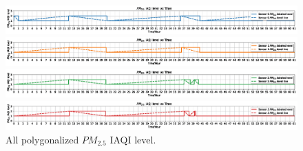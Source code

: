 \begin{figure}[!htbp]
    \begin{center}
        \includegraphics[width=\linewidth]{fig/labeled_iaqi_level/pm25_0_labeled_iaqi_level.png}
    \end{center}
    \begin{center}
        \includegraphics[width=\linewidth]{fig/labeled_iaqi_level/pm25_1_labeled_iaqi_level.png}
    \end{center}
    \begin{center}
        \includegraphics[width=\linewidth]{fig/labeled_iaqi_level/pm25_2_labeled_iaqi_level.png}
    \end{center}
    \begin{center}
        \includegraphics[width=\linewidth]{fig/labeled_iaqi_level/pm25_3_labeled_iaqi_level.png}
    \end{center}
    \caption{All polygonalized $PM_{2.5}$ IAQI level.}
    \label{fig:appendix:all_pm25_polygonalized_iaqi_level}
\end{figure}

